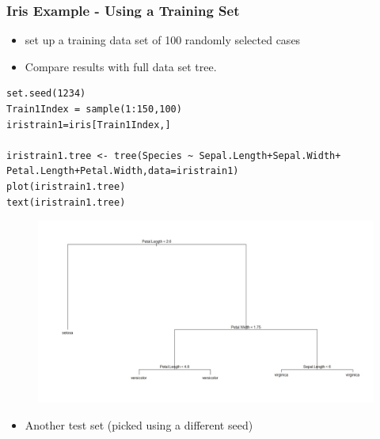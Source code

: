 \documentclass[caret-main.tex]{subfiles}
\begin{document}
\newpage
\subsubsection{Iris Example - Using a Training Set}
\begin{itemize}
\item set up a training data set of 100 randomly selected cases
\item Compare results with full data set tree.
\end{itemize}

\begin{framed}
\begin{verbatim}
set.seed(1234)
Train1Index = sample(1:150,100)
iristrain1=iris[Train1Index,]

iristrain1.tree <- tree(Species ~ Sepal.Length+Sepal.Width+
Petal.Length+Petal.Width,data=iristrain1)
plot(iristrain1.tree)
text(iristrain1.tree)
\end{verbatim}
\end{framed}
\begin{figure}[h!]
\centering
\includegraphics[width=0.80\linewidth]{./iristree2}
\caption{}
\label{fig:iristree2}
\end{figure}

\newpage

\begin{itemize}
\item Another test set (picked using a different seed)
\end{itemize}
\end{document}
